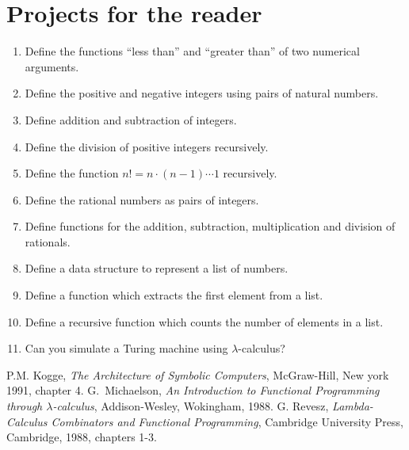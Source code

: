\documentclass[12pt]{article}
\begin{document}

\section{Projects for the reader}
\begin{enumerate} 
\item Define the functions ``less than'' and ``greater than'' of two numerical arguments.
\item Define the positive and negative integers using pairs of natural numbers.
\item Define addition and subtraction of integers.
\item Define the division of positive integers recursively.
\item Define the function $n!=n\cdot (n-1)\cdots1$ recursively.
\item Define the rational numbers as pairs of integers.
\item Define functions for the addition, subtraction, multiplication and division of rationals.
\item Define a data structure to represent a list of numbers.
\item Define a function which extracts the first element from a list.
\item Define a recursive function which counts the number of elements in a list.
\item Can you simulate a Turing machine using $\lambda$-calculus?
\end{enumerate}

\begin{thebibliography}{x}
 P.M. Kogge, {\it The Architecture of Symbolic Computers\/}, McGraw-Hill, New york 1991, chapter 4.
 G.\ Michaelson, {\it An Introduction to Functional Programming through $\lambda$-calculus\/}, Addison-Wesley, Wokingham, 1988.
 G. Revesz, {\it Lambda-Calculus Combinators and Functional Programming\/}, Cambridge University Press, Cambridge, 1988, chapters 1-3.
\end{thebibliography}
 
\end{document}
